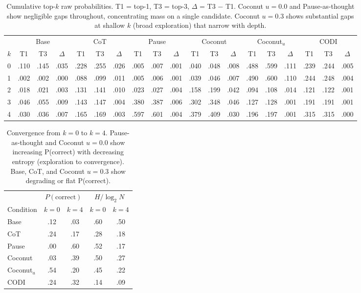 \begin{table}[h!]
\centering
\small
\setlength{\tabcolsep}{4pt}
\caption{Cumulative top-$k$ raw probabilities. T1 = top-1, T3 = top-3, $\Delta$ = T3 $-$ T1. Coconut $u{=}0.0$ and Pause-as-thought show negligible gaps throughout, concentrating mass on a single candidate. Coconut $u{=}0.3$ shows substantial gaps at shallow $k$ (broad exploration) that narrow with depth.}
\begin{tabular}{l ccc ccc ccc ccc ccc ccc}
\toprule
 & \multicolumn{3}{c}{Base} & \multicolumn{3}{c}{CoT} & \multicolumn{3}{c}{Pause} & \multicolumn{3}{c}{Coconut} & \multicolumn{3}{c}{Coconut$_{u}$} & \multicolumn{3}{c}{CODI} \\
\cmidrule(lr){2-4} \cmidrule(lr){5-7} \cmidrule(lr){8-10} \cmidrule(lr){11-13} \cmidrule(lr){14-16} \cmidrule(lr){17-19}
$k$ & T1 & T3 & $\Delta$ & T1 & T3 & $\Delta$ & T1 & T3 & $\Delta$ & T1 & T3 & $\Delta$ & T1 & T3 & $\Delta$ & T1 & T3 & $\Delta$ \\
\midrule
0 & .110 & .145 & .035 & .228 & .255 & .026 & .005 & .007 & .001 & .040 & .048 & .008 & .488 & .599 & .111 & .239 & .244 & .005 \\
1 & .002 & .002 & .000 & .088 & .099 & .011 & .005 & .006 & .001 & .039 & .046 & .007 & .490 & .600 & .110 & .244 & .248 & .004 \\
2 & .018 & .021 & .003 & .131 & .141 & .010 & .023 & .027 & .004 & .158 & .199 & .042 & .094 & .108 & .014 & .121 & .122 & .001 \\
3 & .046 & .055 & .009 & .143 & .147 & .004 & .380 & .387 & .006 & .302 & .348 & .046 & .127 & .128 & .001 & .191 & .191 & .001 \\
4 & .030 & .036 & .007 & .165 & .169 & .003 & .597 & .601 & .004 & .379 & .409 & .030 & .196 & .197 & .001 & .315 & .315 & .000 \\
\bottomrule
\end{tabular}
\label{tab:candidate_parallelism}
\end{table}


\begin{table}[h!]
\centering
\small
\caption{Convergence from $k{=}0$ to $k{=}4$. Pause-as-thought and Coconut $u{=}0.0$ show increasing P(correct) with decreasing entropy (exploration to convergence). Base, CoT, and Coconut $u{=}0.3$ show degrading or flat P(correct).}
\begin{tabular}{l cc cc}
\toprule
& \multicolumn{2}{c}{$P(\text{correct})$} & \multicolumn{2}{c}{$H/\log_2 N$} \\
\cmidrule(lr){2-3} \cmidrule(lr){4-5}
Condition & $k{=}0$ & $k{=}4$ & $k{=}0$ & $k{=}4$ \\
\midrule
Base & .12 & .03 & .60 & .50 \\
CoT & .24 & .17 & .28 & .18 \\
Pause & .00 & .60 & .52 & .17 \\
Coconut & .03 & .39 & .50 & .27 \\
Coconut$_{u}$ & .54 & .20 & .45 & .22 \\
CODI & .24 & .32 & .14 & .09 \\
\bottomrule
\end{tabular}
\label{tab:convergence_trajectories}
\end{table}


